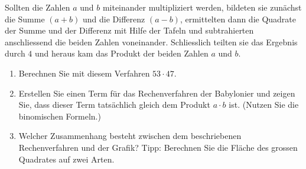 \begin{LA}
\begin{enumerate}
              Sollten die Zahlen \(a\) und \(b\) miteinander multipliziert werden, bildeten sie zunächst die Summe \((a+b)\) und die Differenz \((a-b)\), ermittelten dann die Quadrate der Summe und der Differenz mit Hilfe der Tafeln und subtrahierten anschliessend die beiden Zahlen voneinander. Schliesslich teilten sie das Ergebnis durch \(4\) und heraus kam das Produkt der beiden Zahlen \(a\) und \(b\).

              \begin{enumerate}
                  \item Berechnen Sie mit diesem Verfahren \(53\cdot47\).

                  \item Erstellen Sie einen Term für das Rechenverfahren der Babylonier und zeigen Sie, dass dieser Term tatsächlich gleich dem Produkt \(a\cdot b\) ist. (Nutzen Sie die binomischen Formeln.)

                  \item Welcher Zusammenhang besteht zwischen dem beschriebenen Rechenverfahren und der Grafik? Tipp: Berechnen Sie die Fläche des grossen Quadrates auf zwei Arten.

                        \begin{center}
\end{center}
\end{enumerate}
\end{enumerate}
\end{LA}
